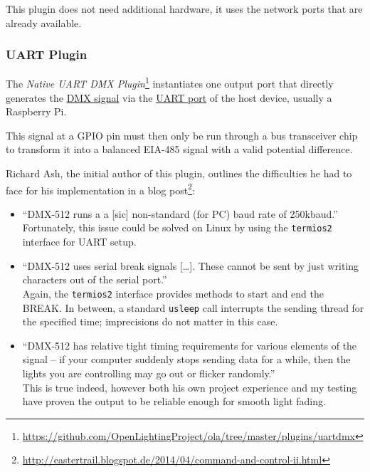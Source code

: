 This plugin does not need additional hardware, it uses the network ports
that are already available.

\subsubsection{UART Plugin}\label{sec:ola-uart-plugin}

The \emph{Native UART DMX Plugin}\footnote{\url{https://github.com/OpenLightingProject/ola/tree/master/plugins/uartdmx}}
instantiates one output port that directly generates the
\protect\hyperlink{sec:dmx-protocol}{DMX signal} via the
\protect\hyperlink{sec:uart}{UART port} of the host device, usually a
Raspberry Pi.

This signal at a GPIO pin must then only be run through a bus
transceiver chip to transform it into a balanced EIA-485 signal with a
valid potential difference.

Richard Ash, the initial author of this plugin, outlines the
difficulties he had to face for his implementation in a blog
post\footnote{\url{http://eastertrail.blogspot.de/2014/04/command-and-control-ii.html}}:

\begin{itemize}
\tightlist
\item
  ``DMX-512 runs a a {[}sic{]} non-standard (for PC) baud rate of
  250kbaud.''\\
  Fortunately, this issue could be solved on Linux by using the
  \colorbox{WhiteSmoke}{\lstinline!termios2!} interface for UART setup.
\item
  ``DMX-512 uses serial break signals {[}\ldots{}{]}. These cannot be
  sent by just writing characters out of the serial port.''\\
  Again, the \colorbox{WhiteSmoke}{\lstinline!termios2!} interface provides methods to start
  and end the BREAK. In between, a standard \colorbox{WhiteSmoke}{\lstinline!usleep!} call
  interrupts the sending thread for the specified time; imprecisions do
  not matter in this case.
\item
  ``DMX-512 has relative tight timing requirements for various elements
  of the signal -- if your computer suddenly stops sending data for a
  while, then the lights you are controlling may go out or flicker
  randomly.''\\
  This is true indeed, however both his own project experience and my
  testing have proven the output to be reliable enough for smooth light
  fading.
\end{itemize}

